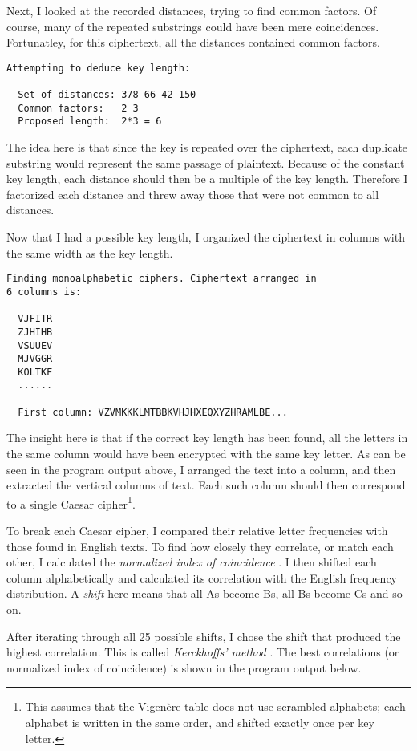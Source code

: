 \documentclass[a4paper,english,12pt]{article}
\begin{document}
Next, I looked at the recorded distances, trying to find common factors. Of
course, many of the repeated substrings could have been mere coincidences.
Fortunatley, for this ciphertext, all the distances contained common factors.

\begin{verbatim}
Attempting to deduce key length:

  Set of distances: 378 66 42 150
  Common factors:   2 3
  Proposed length:  2*3 = 6
\end{verbatim}

The idea here is that since the key is repeated over the ciphertext, each
duplicate substring would represent the same passage of plaintext. Because of
the constant key length, each distance should then be a multiple of the key
length. Therefore I factorized each distance and threw away those that were not
common to all distances.

Now that I had a possible key length, I organized the ciphertext in columns
with the same width as the key length.

\begin{verbatim}
Finding monoalphabetic ciphers. Ciphertext arranged in
6 columns is:

  VJFITR
  ZJHIHB
  VSUUEV
  MJVGGR
  KOLTKF
  ......

  First column: VZVMKKKLMTBBKVHJHXEQXYZHRAMLBE...
\end{verbatim}

The insight here is that if the correct key length has been found, all the
letters in the same column would have been encrypted with the same key letter.
As can be seen in the program output above, I arranged the text into a column,
and then extracted the vertical columns of text. Each such column should then
correspond to a single Caesar cipher\footnote{This assumes that the Vigenère
table does not use scrambled alphabets; each alphabet is written in the same
order, and shifted exactly once per key letter.}.

To break each Caesar cipher, I compared their relative letter frequencies with
those found in English texts. To find how closely they correlate, or match each
other, I calculated the \textit{normalized index of coincidence}
\cite{wiki:coincidence}. I then shifted each column alphabetically and
calculated its correlation with the English frequency distribution.  A
\textit{shift} here means that all As become Bs, all Bs become Cs and so on.

After iterating through all 25 possible shifts, I chose the shift that produced
the highest correlation. This is called \textit{Kerckhoffs' method}
\cite{wiki:vigenere}. The best correlations (or normalized index of
coincidence) is shown in the program output below.
\end{document}
